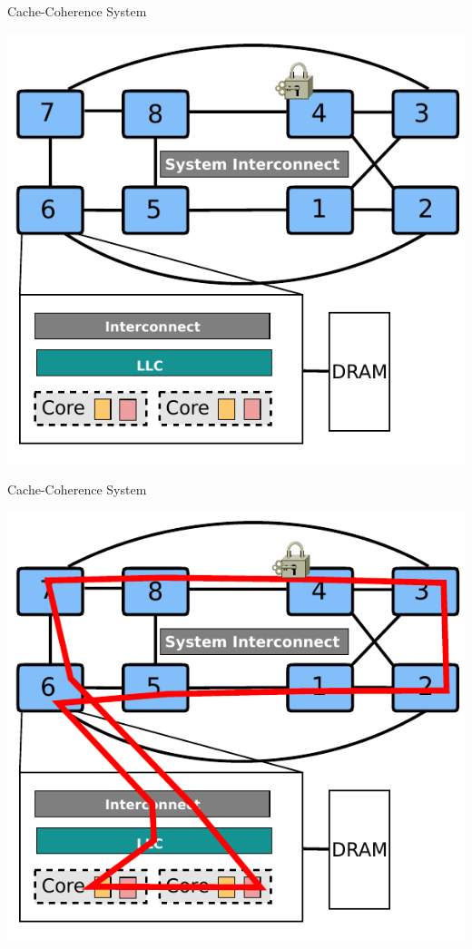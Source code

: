\documentclass[english]{beamer} %
\begin{document}
\begin{frame}{Cache-Coherence System}
\begin{center}
\includegraphics[scale=0.8]{fig/archcache_2}
\end{center}
\end{frame}

\begin{frame}{Cache-Coherence System}
\begin{center}
\includegraphics[scale=0.8]{fig/archcache_3}
\end{center}
\end{frame}
\end{document}
